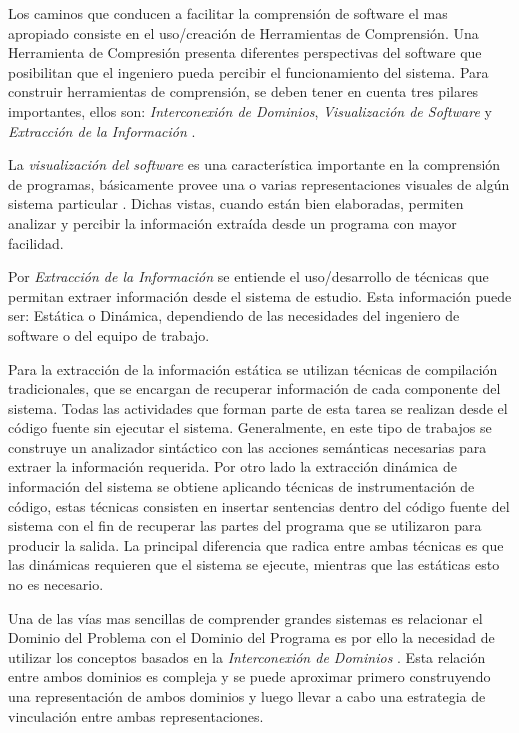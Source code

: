 \documentclass[12pt]{report}
\begin{document}
Los caminos que conducen a facilitar la comprensión de software el mas apropiado consiste 
en el uso/creación de Herramientas de Comprensión. 
Una Herramienta de Compresión presenta diferentes perspectivas del software que 
posibilitan que el ingeniero pueda percibir el funcionamiento del sistema. 
Para construir herramientas de comprensión, se deben tener en cuenta tres pilares 
importantes, ellos son: \textit{Interconexión de Dominios}, 
\textit{Visualización de Software} y 
\textit{Extracción de la Información} \cite{STOREY99,BROOK82}.

La \textit{visualización del software} es una característica importante en la comprensión de programas, básicamente provee una o varias representaciones visuales de algún sistema particular \cite{BRM10}.
Dichas vistas, cuando están bien elaboradas, permiten analizar y percibir la información extraída desde un programa con mayor facilidad.

Por \textit{Extracción de la Información} se entiende el uso/desarrollo de técnicas que 
permitan extraer información desde el sistema de estudio. 
Esta información puede ser: Estática o Dinámica, dependiendo de las necesidades del 
ingeniero de software o del equipo de trabajo.

Para la extracción de la información estática se utilizan técnicas de compilación tradicionales, que se encargan de recuperar información de cada componente del sistema. Todas las actividades que forman parte de esta tarea se realizan desde el código fuente sin ejecutar el sistema. Generalmente, en este tipo de trabajos se construye un analizador sintáctico con las acciones semánticas necesarias para extraer la información requerida.
Por otro lado la extracción dinámica de información del sistema se obtiene  
aplicando técnicas de instrumentación de código, estas técnicas consisten en insertar sentencias dentro del código fuente del sistema con el fin de recuperar las partes del programa que se utilizaron para 
producir la salida. 
La principal diferencia que radica entre ambas técnicas es que las dinámicas requieren que el sistema se ejecute, mientras que las estáticas esto no es necesario.


Una de las vías mas sencillas de comprender grandes sistemas es relacionar el Dominio del Problema con el Dominio del Programa es por ello la necesidad de utilizar los conceptos basados en la \textit{Interconexión de Dominios} \cite{BRM10}.
Esta relación entre ambos dominios es compleja y se puede aproximar primero construyendo una representación de ambos dominios y luego llevar a cabo una estrategia de vinculación entre ambas representaciones.
\end{document}
